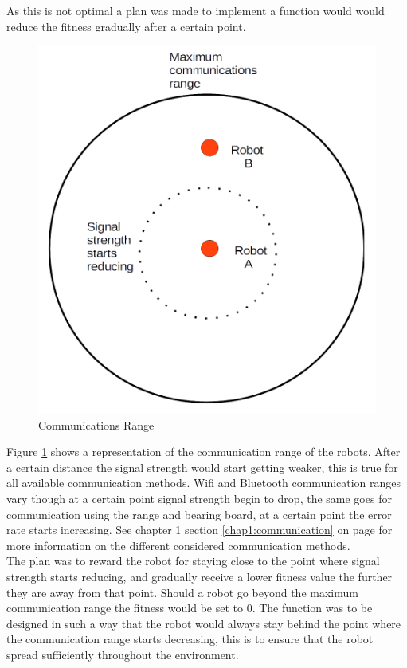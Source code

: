As this is not optimal a plan was made to implement a function would would reduce the fitness gradually after a certain point. 

\begin{figure}[h]
\centering
\includegraphics[scale=0.5]{Chapter4/images/comms.png}
\caption{Communications Range}
\label{fig:coms}
\end{figure}

Figure \ref{fig:coms} shows a representation of the communication range of the robots. After a certain distance the signal strength would start getting weaker, this is true for all available communication methods. Wifi and Bluetooth communication ranges vary though at a certain point signal strength begin to drop, the same goes for communication using the range and bearing board, at a certain point the error rate starts increasing. See chapter 1 section \ref{chap1:communication} on page \pageref{chap1:communication} for more information on the different considered communication methods. \\

The plan was to reward the robot for staying close to the point where signal strength starts reducing, and gradually receive a lower fitness value the further they are away from that point. Should a robot go beyond the maximum communication range the fitness would be set to 0. 
The function was to be designed in such a way that the robot would always stay behind the point where the communication range starts decreasing, this is to ensure that the robot spread sufficiently throughout the environment. \\

